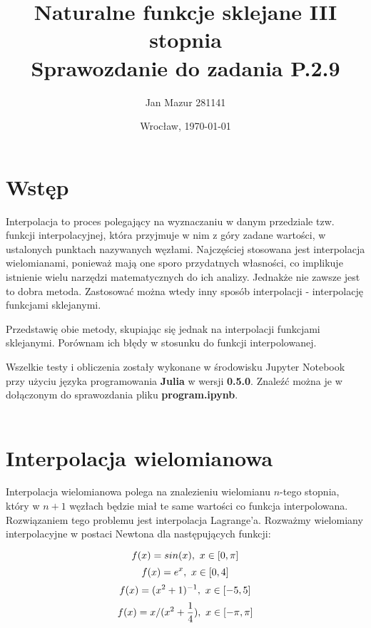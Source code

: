 \documentclass{article}
\author{Jan Mazur 281141}
\date{Wrocław, \today}
\title{\textbf{Naturalne funkcje sklejane III stopnia} \\ Sprawozdanie do zadania P.2.9	}
\begin{document}
\maketitle

\section{Wstęp}

Interpolacja to proces polegający na wyznaczaniu w danym przedziale tzw. funkcji interpolacyjnej, która przyjmuje w nim z góry zadane wartości, w ustalonych punktach nazywanych węzłami. \cite{wikipedia_pl}
Najczęściej stosowana jest interpolacja wielomianami, ponieważ  mają one sporo przydatnych własności, co implikuje istnienie wielu narzędzi matematycznych do ich analizy. Jednakże nie zawsze jest to dobra metoda.
Zastosować można wtedy inny sposób interpolacji - interpolację funkcjami sklejanymi.

Przedstawię obie metody, skupiając się jednak na interpolacji funkcjami sklejanymi. Porównam ich błędy w stosunku do funkcji interpolowanej.

Wszelkie testy i obliczenia zostały wykonane w środowisku Jupyter Notebook przy użyciu języka programowania \textbf{Julia} w wersji \textbf{0.5.0}.
Znaleźć można je w dołączonym do sprawozdania pliku \textbf{program.ipynb}.\\\\

\section{Interpolacja wielomianowa}
Interpolacja wielomianowa polega na znalezieniu wielomianu $n$-tego stopnia, który w $n+1$ węzłach będzie miał te same wartości co funkcja interpolowana. Rozwiązaniem tego problemu jest interpolacja Lagrange'a. Rozważmy wielomiany interpolacyjne w postaci Newtona dla następujących funkcji:

\begin{equation}\label{fun1}
	f(x) = sin(x), \textnormal{ } x \in [0,\pi]
\end{equation}
\begin{equation}\label{fun2}
	f(x) = e^x, \textnormal{ } x \in [0,4]
\end{equation}
\begin{equation}\label{fun3}
	f(x) = (x^{2}+1)^{-1}, \textnormal{ } x \in [-5,5]
\end{equation}
\begin{equation}\label{fun4}
	f(x) = x/(x^{2} + \frac{1}{4}), \textnormal{ } x \in [-\pi,\pi]
\end{equation}
\end{document}
